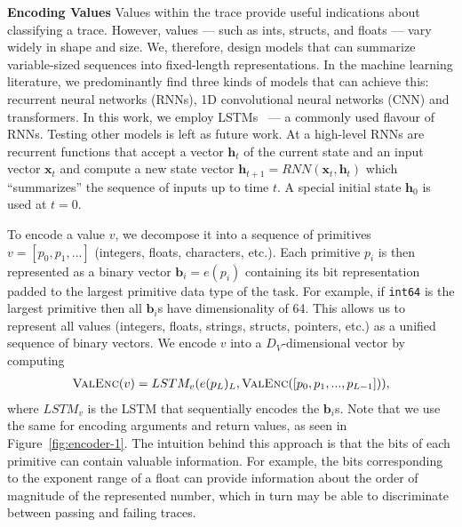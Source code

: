 \textbf{Encoding Values}
Values within the trace provide useful indications about classifying a trace. %
However, values --- such as ints, structs, and floats --- vary widely in shape and size. We, therefore, design models that can summarize variable-sized sequences into fixed-length representations. In the machine learning literature, we predominantly find three kinds of models that can achieve this: recurrent neural networks (RNNs), 1D convolutional neural networks (CNN) and transformers. In this work, we employ LSTMs~\cite{hochreiter1997long} --- a commonly used flavour of RNNs. Testing other models is left as future work. At a high-level RNNs are recurrent functions that accept a vector $\mathbf{h}_t$ of the current state and an input vector $\mathbf{x}_t$ and compute a new state vector $\mathbf{h}_{t+1}=RNN(\mathbf{x}_t, \mathbf{h}_t)$ which ``summarizes'' the sequence of inputs up to time $t$. A special initial state $\mathbf{h}_0$ is used at $t=0$.

To encode a value $v$, we decompose it into a sequence of primitives $v=[p_0, p_1, ...]$ (integers, floats, characters, etc.). Each primitive $p_i$ is then represented as a binary vector $\mathbf{b}_i=e(p_i)$ containing its bit representation padded to the largest primitive data type of the task. For example, if \texttt{int64} is the largest primitive then all $\mathbf{b}_i$s have dimensionality of 64. This allows us to represent all values (integers, floats, strings, structs, pointers, etc.) as a unified sequence of binary vectors. We encode $v$ into a $D_V$-dimensional vector by computing
\begin{align*}
	\textsc{ValEnc}(v) = LSTM_{v}(e(p_L)_L, \textsc{ValEnc}([p_0, p_1, ..., p_{L-1}])),
\end{align*}
where $LSTM_{v}$ is the LSTM that sequentially encodes the $\mathbf{b}_i$s. Note that we use the same \valEncoder for encoding arguments and return values, as seen in Figure~\ref{fig:encoder-1}. The intuition behind this approach is that the bits of each primitive can contain valuable information. For example, the bits corresponding to the exponent range of a float can provide information about the order of magnitude of the represented number, which in turn may be able to discriminate between passing and failing traces.


